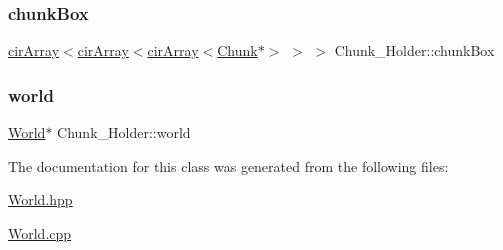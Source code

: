 \subsubsection{\texorpdfstring{chunk\+Box}{chunkBox}}
{\footnotesize\ttfamily \mbox{\hyperlink{classcirArray}{cir\+Array}}$<$\mbox{\hyperlink{classcirArray}{cir\+Array}}$<$\mbox{\hyperlink{classcirArray}{cir\+Array}}$<$\mbox{\hyperlink{classChunk}{Chunk}}$\ast$$>$ $>$ $>$ Chunk\+\_\+\+Holder\+::chunk\+Box\hspace{0.3cm}{\ttfamily [private]}}

\mbox{\label{classChunk__Holder_acc9696ef1450d475db150e000bc03c87}} 
\subsubsection{\texorpdfstring{world}{world}}
{\footnotesize\ttfamily \mbox{\hyperlink{classWorld}{World}}$\ast$ Chunk\+\_\+\+Holder\+::world\hspace{0.3cm}{\ttfamily [private]}}



The documentation for this class was generated from the following files\+:\begin{DoxyCompactItemize}
\item 
\mbox{\hyperlink{World_8hpp}{World.\+hpp}}\item 
\mbox{\hyperlink{World_8cpp}{World.\+cpp}}\end{DoxyCompactItemize}
